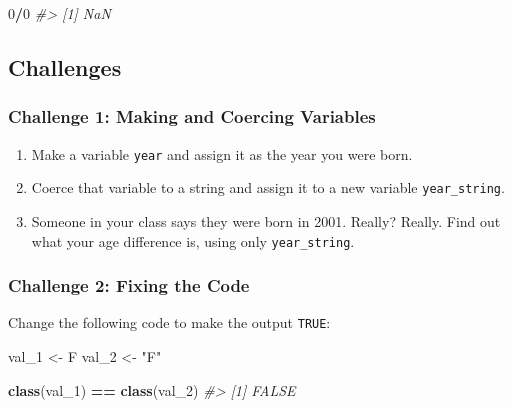 \documentclass[]{book}
\newenvironment{Shaded}{\begin{snugshade}}{\end{snugshade}}
\newcommand{\KeywordTok}[1]{\textcolor[rgb]{0.13,0.29,0.53}{\textbf{#1}}}
\newcommand{\DecValTok}[1]{\textcolor[rgb]{0.00,0.00,0.81}{#1}}
\newcommand{\StringTok}[1]{\textcolor[rgb]{0.31,0.60,0.02}{#1}}
\newcommand{\CommentTok}[1]{\textcolor[rgb]{0.56,0.35,0.01}{\textit{#1}}}
\newcommand{\OperatorTok}[1]{\textcolor[rgb]{0.81,0.36,0.00}{\textbf{#1}}}
\newcommand{\NormalTok}[1]{#1}
\providecommand{\tightlist}{%
  \setlength{\itemsep}{0pt}\setlength{\parskip}{0pt}}
\begin{document}
\begin{Shaded}
\begin{Highlighting}[]
\DecValTok{0}\OperatorTok{/}\DecValTok{0}
\CommentTok{#> [1] NaN}
\end{Highlighting}
\end{Shaded}

\subsection{Challenges}\label{challenges-3}

\subsubsection*{Challenge 1: Making and Coercing
Variables}\label{challenge-1-making-and-coercing-variables}

\begin{enumerate}
\def\labelenumi{\arabic{enumi}.}
\tightlist
\item
  Make a variable \texttt{year} and assign it as the year you were born.
\item
  Coerce that variable to a string and assign it to a new variable
  \texttt{year\_string}.
\item
  Someone in your class says they were born in 2001. Really? Really.
  Find out what your age difference is, using only
  \texttt{year\_string}.
\end{enumerate}

\subsubsection*{Challenge 2: Fixing the
Code}\label{challenge-2-fixing-the-code}

Change the following code to make the output \texttt{TRUE}:

\begin{Shaded}
\begin{Highlighting}[]
\NormalTok{val_}\DecValTok{1}\NormalTok{ <-}\StringTok{ }\NormalTok{F}
\NormalTok{val_}\DecValTok{2}\NormalTok{ <-}\StringTok{ "F"}

\KeywordTok{class}\NormalTok{(val_}\DecValTok{1}\NormalTok{) }\OperatorTok{==}\StringTok{ }\KeywordTok{class}\NormalTok{(val_}\DecValTok{2}\NormalTok{)}
\CommentTok{#> [1] FALSE}
\end{Highlighting}
\end{Shaded}
\end{document}
